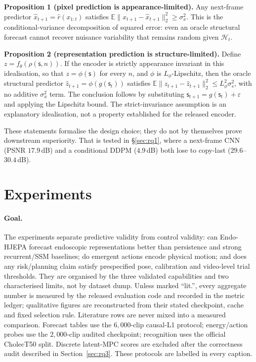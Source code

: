 \documentclass[preprint,12pt]{elsarticle}
\begin{document}
\textbf{Proposition 1 (pixel prediction is appearance-limited).}
Any next-frame predictor $\hat x_{t+1}=\hat r(x_{1:t})$ satisfies
$\mathbb{E}\|x_{t+1}-\hat x_{t+1}\|_2^2\ge\sigma_x^2$.
This is the conditional-variance decomposition of squared error: even an
oracle structural forecast cannot recover nuisance variability that remains
random given $\mathcal H_t$.

\textbf{Proposition 2 (representation prediction is structure-limited).}
Define $z=f_\theta(\rho(\mathsf{s},n))$. If the encoder is strictly appearance
invariant in this idealisation, so that $z=\phi(\mathsf{s})$ for every $n$, and
$\phi$ is $L_\phi$-Lipschitz, then the oracle structural predictor
$\hat z_{t+1}=\phi(g(\mathsf{s}_t))$ satisfies
$\mathbb{E}\|z_{t+1}-\hat z_{t+1}\|_2^2
\le L_\phi^2\sigma_s^2$, with no additive $\sigma_x^2$ term.
The conclusion follows by substituting
$\mathsf{s}_{t+1}=g(\mathsf{s}_t)+\varepsilon$ and applying the Lipschitz
bound. The strict-invariance assumption is an explanatory idealisation, not a
property established for the released encoder.

These statements formalise the design choice; they do not by themselves prove downstream superiority.
That is tested in \S\ref{sec:rq1}, where a next-frame CNN (PSNR $17.9$\,dB) and a conditional DDPM ($4.9$\,dB) both lose to copy-last ($29.6$--$30.4$\,dB).

\section{Experiments}
\label{sec:results}

\paragraph{Goal.}
The experiments separate predictive validity from control validity: can
Endo-HJEPA forecast endoscopic representations better than persistence and
strong recurrent/SSM baselines; do emergent actions encode physical motion; and
does any risk/planning claim satisfy prespecified pose, calibration and
video-level trial thresholds.
They are organised by the three validated capabilities and two characterised
limits, not by dataset dump.
Unless marked ``lit.'', every aggregate number is measured by the released
evaluation code and recorded in the metric ledger; qualitative figures are
reconstructed from their stated checkpoint, cache and fixed selection rule.
Literature rows are never mixed into a measured comparison.
Forecast tables use the $6{,}000$-clip causal-L1 protocol; energy/action probes
use the $2{,}000$-clip audited checkpoint; recognition uses the official
CholecT50 split. Discrete latent-MPC scores are excluded after the correctness
audit described in Section~\ref{sec:rq3}.
These protocols are labelled in every caption.
\end{document}
